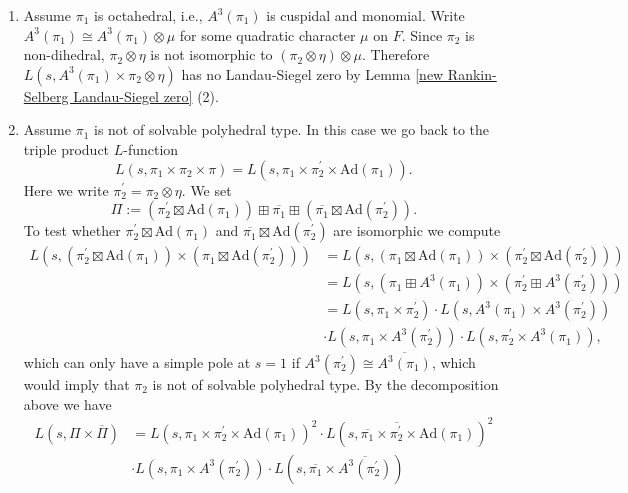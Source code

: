 \documentclass[12pt]{amsart}
\newcommand{\Ad}{\text{Ad}}
\newcommand{\ov}{\overline}
\begin{document}
\begin{enumerate}
\begin{enumerate}
        for some cubic character $\nu$ on $F$. Thus we have 
        $$L(s,A^3(\pi_1) \times \pi_2 \otimes \eta) = L(s,\pi_1 \times \pi_2 \otimes \eta\nu) \cdot L(s,\pi_1 \times \pi_2 \otimes \eta\nu^2)$$
        which has no Landau-Siegel by Lemma \ref{Rankin Selberg Landau-Siegel zero} (1).
        \item Assume $\pi_1$ is octahedral, i.e., $A^3(\pi_1)$ is cuspidal and monomial. Write $A^3(\pi_1) \cong A^3(\pi_1) \otimes \mu$ for some quadratic character $\mu$ on $F$. Since $\pi_2$ is non-dihedral, $\pi_2 \otimes \eta$ is not isomorphic to $(\pi_2 \otimes \eta) \otimes \mu$. Therefore $L(s,A^3(\pi_1) \times \pi_2 \otimes \eta)$ has no Landau-Siegel zero by Lemma \ref{new Rankin-Selberg Landau-Siegel zero} (2).
        \item Assume $\pi_1$ is not of solvable polyhedral type. In this case we go back to the triple product $L$-function
        $$L(s,\pi_1 \times \pi_2 \times \pi) = L(s,\pi_1 \times \pi_2^\prime \times \Ad(\pi_1)).$$
        Here we write $\pi_2^\prime = \pi_2 \otimes \eta$. We set 
        $$\Pi := (\pi_2^\prime \boxtimes \Ad(\pi_1)) \boxplus \ov{\pi_1} \boxplus (\ov{\pi_1} \boxtimes \Ad(\pi_2^\prime)).$$
        To test whether $\pi_2^\prime \boxtimes \Ad(\pi_1)$ and $\ov{\pi_1} \boxtimes \Ad(\pi_2^\prime)$ are isomorphic we compute
        \begin{align*}
            L(s,(\pi_2^\prime \boxtimes \Ad(\pi_1)) \times (\pi_1 \boxtimes \Ad(\pi_2^\prime))) &= L(s,(\pi_1 \boxtimes \Ad(\pi_1)) \times (\pi_2^\prime \boxtimes \Ad(\pi_2^\prime))) \\
            &= L(s,(\pi_1 \boxplus A^3(\pi_1)) \times (\pi_2^\prime \boxplus A^3(\pi_2^\prime))) \\
            &= L(s,\pi_1 \times \pi_2^\prime) \cdot L(s,A^3(\pi_1) \times A^3(\pi_2^\prime)) \\
            &\cdot L(s,\pi_1 \times A^3(\pi_2^\prime)) \cdot L(s,\pi_2^\prime \times A^3(\pi_1)),
        \end{align*}
        which can only have a simple pole at $s=1$ if $A^3(\pi_2^\prime) \cong \ov{A^3(\pi_1)}$, which would imply that $\pi_2$ is not of solvable polyhedral type. By the decomposition above we have 
        \begin{align*}
            L(s,\Pi \times \ov{\Pi}) &= L(s,\pi_1 \times \pi_2^\prime \times \Ad(\pi_1))^2 \cdot L(s,\ov{\pi_1} \times \ov{\pi_2^\prime} \times \Ad(\pi_1))^2 \\
            &\cdot L(s,\pi_1 \times A^3(\pi_2^\prime)) \cdot L(s,\ov{\pi_1} \times \ov{A^3(\pi_2^\prime)}) \\

\end{align*}
\end{enumerate}
\end{enumerate}
\end{document}
